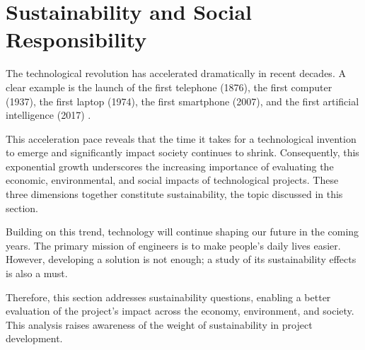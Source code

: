 \section{Sustainability and Social Responsibility}
\label{sec:sustainability}

The technological revolution has accelerated dramatically in recent decades. A clear example is the launch of the first telephone (1876), the first computer (1937), the first laptop (1974), the first smartphone (2007), and the first artificial intelligence (2017) \cite{history-of-technology-timeline}.

This acceleration pace reveals that the time it takes for a technological invention to emerge and significantly impact society continues to shrink. Consequently, this exponential growth underscores the increasing importance of evaluating the economic, environmental, and social impacts of technological projects. These three dimensions together constitute sustainability, the topic discussed in this section.

Building on this trend, technology will continue shaping our future in the coming years. The primary mission of engineers is to make people's daily lives easier. However, developing a solution is not enough; a study of its sustainability effects is also a must. 

Therefore, this section addresses sustainability questions, enabling a better evaluation of the project's impact across the economy, environment, and society. This analysis raises awareness of the weight of sustainability in project development.







